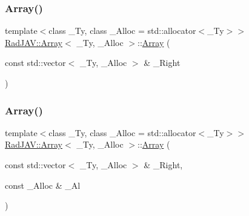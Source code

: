 \subsubsection{\texorpdfstring{Array()}{Array()}\hspace{0.1cm}{\footnotesize\ttfamily [7/9]}}
{\footnotesize\ttfamily template$<$class \+\_\+\+Ty, class \+\_\+\+Alloc = std\+::allocator$<$\+\_\+\+Ty$>$$>$ \\
\mbox{\hyperlink{class_rad_j_a_v_1_1_array}{Rad\+J\+A\+V\+::\+Array}}$<$ \+\_\+\+Ty, \+\_\+\+Alloc $>$\+::\mbox{\hyperlink{class_rad_j_a_v_1_1_array}{Array}} (\begin{DoxyParamCaption}\item[{const std\+::vector$<$ \+\_\+\+Ty, \+\_\+\+Alloc $>$ \&}]{\+\_\+\+Right }\end{DoxyParamCaption})\hspace{0.3cm}{\ttfamily [inline]}}

\mbox{\label{class_rad_j_a_v_1_1_array_a657a17cc80f13bc88f89a43649628c53}} 
\subsubsection{\texorpdfstring{Array()}{Array()}\hspace{0.1cm}{\footnotesize\ttfamily [8/9]}}
{\footnotesize\ttfamily template$<$class \+\_\+\+Ty, class \+\_\+\+Alloc = std\+::allocator$<$\+\_\+\+Ty$>$$>$ \\
\mbox{\hyperlink{class_rad_j_a_v_1_1_array}{Rad\+J\+A\+V\+::\+Array}}$<$ \+\_\+\+Ty, \+\_\+\+Alloc $>$\+::\mbox{\hyperlink{class_rad_j_a_v_1_1_array}{Array}} (\begin{DoxyParamCaption}\item[{const std\+::vector$<$ \+\_\+\+Ty, \+\_\+\+Alloc $>$ \&}]{\+\_\+\+Right,  }\item[{const \+\_\+\+Alloc \&}]{\+\_\+\+Al }\end{DoxyParamCaption})\hspace{0.3cm}{\ttfamily [inline]}}

\mbox{\label{class_rad_j_a_v_1_1_array_aac531787851622f2bb7816c80aae36bd}} 
